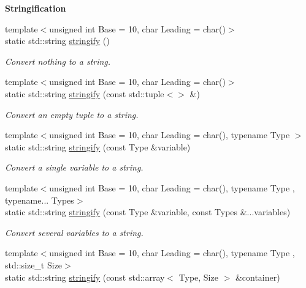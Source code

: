 \begin{Indent}{\bf Stringification}\par
\begin{DoxyCompactItemize}
\item 
{\footnotesize template$<$unsigned int Base = 10, char Leading = char()$>$ }\\static std\-::string \hyperlink{exceptionmagrathea_1_1DataHandler_aabe5421ff733fe6beebb8c738d1fee63}{stringify} ()
\begin{DoxyCompactList}\small\item\em Convert nothing to a string. \end{DoxyCompactList}\item 
{\footnotesize template$<$unsigned int Base = 10, char Leading = char()$>$ }\\static std\-::string \hyperlink{exceptionmagrathea_1_1DataHandler_a7c4ab445f48e1aa494a404e904c54a66}{stringify} (const std\-::tuple$<$$>$ \&)
\begin{DoxyCompactList}\small\item\em Convert an empty tuple to a string. \end{DoxyCompactList}\item 
{\footnotesize template$<$unsigned int Base = 10, char Leading = char(), typename Type $>$ }\\static std\-::string \hyperlink{exceptionmagrathea_1_1DataHandler_a2dd735cedf604372d2942820919a2b0c}{stringify} (const Type \&variable)
\begin{DoxyCompactList}\small\item\em Convert a single variable to a string. \end{DoxyCompactList}\item 
{\footnotesize template$<$unsigned int Base = 10, char Leading = char(), typename Type , typename... Types$>$ }\\static std\-::string \hyperlink{exceptionmagrathea_1_1DataHandler_ab54ac4f7f22feb5b1e7361d321342746}{stringify} (const Type \&variable, const Types \&...variables)
\begin{DoxyCompactList}\small\item\em Convert several variables to a string. \end{DoxyCompactList}\item 
{\footnotesize template$<$unsigned int Base = 10, char Leading = char(), typename Type , std\-::size\-\_\-t Size$>$ }\\static std\-::string \hyperlink{exceptionmagrathea_1_1DataHandler_a71fe2f753a75d7367c34bd035e7e3d62}{stringify} (const std\-::array$<$ Type, Size $>$ \&container)
$$
\end{DoxyCompactItemize}
\end{Indent}
